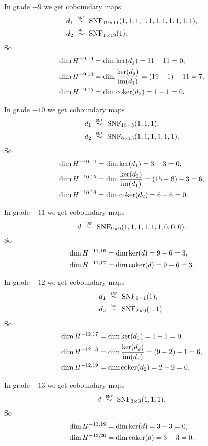 In grade $-9$ we get coboundary maps
\begin{align*}
  d_{1} &\snfsim \SNF_{19\times11}(1,1,1,1,1,1,1,1,1,1,1), \\
  d_{2} &\snfsim \SNF_{1\times19}(1).
\end{align*}
So
\begin{align*}
  \dim H^{-9,13} &= \dim \operatorname{ker}(d_{1}) = 11-11 = 0, \\
  \dim H^{-9,14} &= \dim \dfrac{\operatorname{ker}(d_{2})}{\operatorname{im}(d_{1})} = (19-1) - 11 = 7, \\
  \dim H^{-9,15} &= \dim \operatorname{coker}(d_{2}) = 1 - 1 = 0.
\end{align*}

In grade $-10$ we get coboundary maps
\begin{align*}
  d_{1} &\snfsim \SNF_{15\times3}(1,1,1), \\
  d_{2} &\snfsim \SNF_{6\times15}(1,1,1,1,1,1).
\end{align*}
So
\begin{align*}
  \dim H^{-10,14} &= \dim \operatorname{ker}(d_{1}) = 3-3 = 0, \\
  \dim H^{-10,15} &= \dim \dfrac{\operatorname{ker}(d_{2})}{\operatorname{im}(d_{1})} = (15-6) - 3 = 6, \\
  \dim H^{-10,16} &= \dim \operatorname{coker}(d_{2}) = 6-6 = 0.
\end{align*}

In grade $-11$ we get coboundary maps
\begin{equation*}
  d \snfsim \SNF_{9\times9}(1,1,1,1,1,1,0,0,0).
\end{equation*}
So
\begin{align*}
  \dim H^{-11,16} &= \dim \operatorname{ker}(d) = 9-6 = 3, \\
  \dim H^{-11,17} &= \dim \operatorname{coker}(d) = 9-6 = 3.
\end{align*}

In grade $-12$ we get coboundary maps
\begin{align*}
  d_{1} &\snfsim \SNF_{9\times1}(1), \\
  d_{2} &\snfsim \SNF_{2\times9}(1,1).
\end{align*}
So
\begin{align*}
  \dim H^{-12,17} &= \dim \operatorname{ker}(d_{1}) = 1-1 = 0, \\
  \dim H^{-12,18} &= \dim \dfrac{\operatorname{ker}(d_{2})}{\operatorname{im}(d_{1})} = (9-2) - 1 = 6, \\
  \dim H^{-12,19} &= \dim \operatorname{coker}(d_{2}) = 2-2 = 0.
\end{align*}

In grade $-13$ we get coboundary maps
\begin{equation*}
  d \snfsim \SNF_{3\times3}(1,1,1).
\end{equation*}
So
\begin{align*}
  \dim H^{-13,19} &= \dim \operatorname{ker}(d) = 3-3 = 0, \\
  \dim H^{-13,20} &= \dim \operatorname{coker}(d) = 3-3 = 0.
\end{align*}

